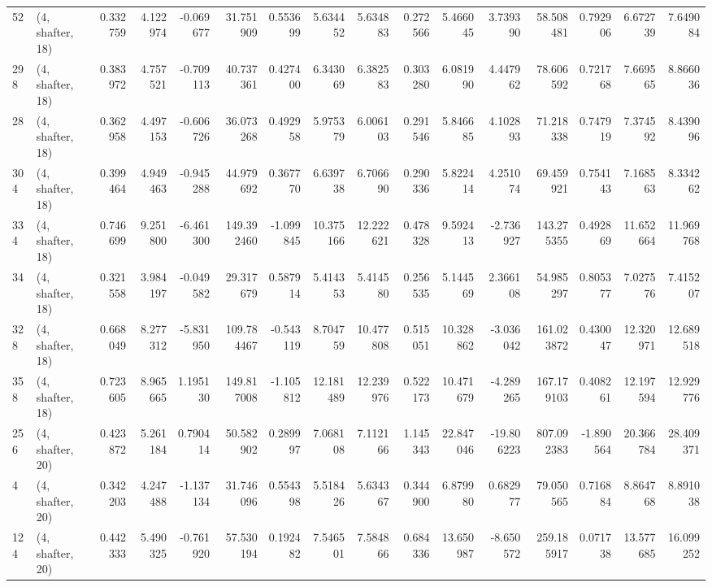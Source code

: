 \begin{tabular}{llrrrrrrrrrrrrrr}
52  &  (4, shafter, 18) &   0.332759 &   4.122974 &  -0.069677 &    31.751909 &   0.553699 &   5.634452 &   5.634883 &  0.272566 &   5.466045 &   3.739390 &    58.508481 &  0.792906 &   6.672739 &   7.649084 \\
298 &  (4, shafter, 18) &   0.383972 &   4.757521 &  -0.709113 &    40.737361 &   0.427400 &   6.343069 &   6.382583 &  0.303280 &   6.081990 &   4.447962 &    78.606592 &  0.721768 &   7.669565 &   8.866036 \\
28  &  (4, shafter, 18) &   0.362958 &   4.497153 &  -0.606726 &    36.073268 &   0.492958 &   5.975379 &   6.006103 &  0.291546 &   5.846685 &   4.102893 &    71.218338 &  0.747919 &   7.374592 &   8.439096 \\
304 &  (4, shafter, 18) &   0.399464 &   4.949463 &  -0.945288 &    44.979692 &   0.367770 &   6.639738 &   6.706690 &  0.290336 &   5.822414 &   4.251074 &    69.459921 &  0.754143 &   7.168563 &   8.334262 \\
334 &  (4, shafter, 18) &   0.746699 &   9.251800 &  -6.461300 &   149.392460 &  -1.099845 &  10.375166 &  12.222621 &  0.478328 &   9.592413 &  -2.736927 &   143.275355 &  0.492869 &  11.652664 &  11.969768 \\
34  &  (4, shafter, 18) &   0.321558 &   3.984197 &  -0.049582 &    29.317679 &   0.587914 &   5.414353 &   5.414580 &  0.256535 &   5.144569 &   2.366108 &    54.985297 &  0.805377 &   7.027576 &   7.415207 \\
328 &  (4, shafter, 18) &   0.668049 &   8.277312 &  -5.831950 &   109.784467 &  -0.543119 &   8.704759 &  10.477808 &  0.515051 &  10.328862 &  -3.036042 &   161.023872 &  0.430047 &  12.320971 &  12.689518 \\
358 &  (4, shafter, 18) &   0.723605 &   8.965665 &   1.195130 &   149.817008 &  -1.105812 &  12.181489 &  12.239976 &  0.522173 &  10.471679 &  -4.289265 &   167.179103 &  0.408261 &  12.197594 &  12.929776 \\
256 &  (4, shafter, 20) &   0.423872 &   5.261184 &   0.790414 &    50.582902 &   0.289997 &   7.068108 &   7.112166 &  1.145343 &  22.847046 & -19.806223 &   807.092383 & -1.890564 &  20.366784 &  28.409371 \\
4   &  (4, shafter, 20) &   0.342203 &   4.247488 &  -1.137134 &    31.746096 &   0.554398 &   5.518426 &   5.634367 &  0.344900 &   6.879980 &   0.682977 &    79.050565 &  0.716884 &   8.864768 &   8.891038 \\
124 &  (4, shafter, 20) &   0.442333 &   5.490325 &  -0.761920 &    57.530194 &   0.192482 &   7.546501 &   7.584866 &  0.684336 &  13.650987 &  -8.650572 &   259.185917 &  0.071738 &  13.577685 &  16.099252 \\

\end{tabular}
